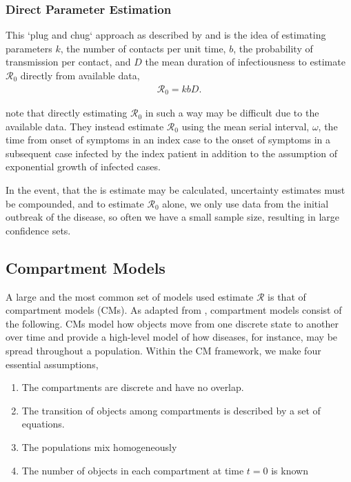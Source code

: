 \documentclass[12pt]{article}
\newcommand{\rr}{\ensuremath{\mathcal{R}_0}}
\begin{document}


\subsubsection{Direct Parameter Estimation }
\label{sec:dpe}

This `plug and chug` approach as described by \cite{lipsitch2003} and \cite{dietz1993estimation} is the idea of estimating parameters $k$, the number of contacts per unit time, $b$, the probability of transmission per contact, and $D$ the mean duration of infectiousness to estimate $\rr$ directly from available data,
\begin{align}
\rr = kbD.
\end{align}

\cite{lipsitch2003} note that directly estimating $\rr$ in such a way may be difficult due to the available data.  They instead estimate $\rr$ using the mean serial interval, $\omega$, the time from onset of symptoms in an index case to the onset of symptoms in a subsequent case infected by the index patient in addition to the assumption of exponential growth of infected cases.

In the event, that the is estimate may be calculated, uncertainty estimates must be compounded, and to estimate $\rr$ alone, we only use data from the initial outbreak of the disease, so often we have a small sample size, resulting in large confidence sets.



\subsection{Compartment Models}
\label{sec:cms}

A large and the most common set of models used estimate $\mathcal{R}$ is that of compartment models (CMs).  As adapted from \cite{daley2001epidemic}, compartment models consist of the following.  CMs model how objects move from one discrete state to another over time and provide a high-level model of how diseases, for instance, may be spread throughout a population.  Within the CM framework, we make four essential assumptions,
\begin{enumerate}
\item The compartments are discrete and have no overlap.
\item The transition of objects among compartments is described by a set of equations.
\item The populations mix homogeneously
  \item The number of objects in each compartment at time $t=0$ is known
  \end{enumerate}  
\end{document}
